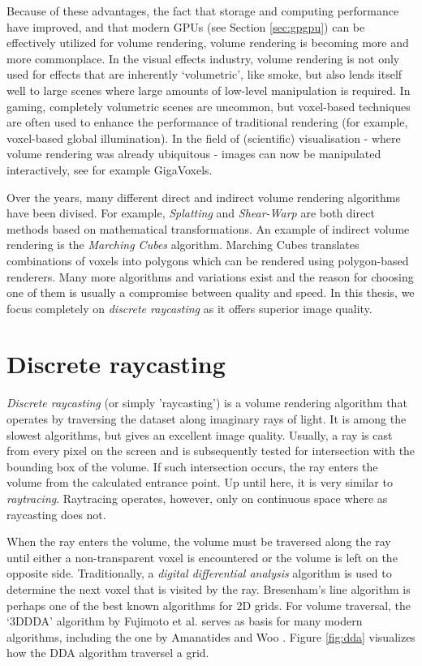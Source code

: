 Because of these advantages, the fact that storage and computing performance have improved, and that modern GPUs (see Section \ref{sec:gpgpu}) can be effectively utilized for volume rendering, volume rendering is becoming more and more commonplace. In the visual effects industry, volume rendering is not only used for effects that are inherently `volumetric', like smoke, but also lends itself well to large scenes where large amounts of low-level manipulation is required. In gaming, completely volumetric scenes are uncommon, but voxel-based techniques are often used to enhance the performance of traditional rendering (for example, voxel-based global illumination\cite{vbgi}). In the field of (scientific) visualisation - where volume rendering was already ubiquitous - images can now be manipulated interactively, see for example GigaVoxels\cite{crassin11}.

Over the years, many different direct and indirect volume rendering algorithms have been divised. For example, \emph{Splatting} \cite{qsplat} and \emph{Shear-Warp} \cite{shearwarp} are both direct methods based on mathematical transformations. An example of indirect volume rendering is the \emph{Marching Cubes} algorithm. Marching Cubes translates combinations of voxels into polygons which can be rendered using polygon-based renderers. Many more algorithms and variations exist and the reason for choosing one of them is usually a compromise between quality and speed. In this thesis, we focus completely on \emph{discrete raycasting} as it offers superior image quality.
%
\section{Discrete raycasting} \label{sec:raycasting}
%
\emph{Discrete raycasting} (or simply 'raycasting') is a volume rendering algorithm that operates by traversing the dataset along imaginary rays of light. It is among the slowest algorithms, but gives an excellent image quality. Usually, a ray is cast from every pixel on the screen and is subsequently tested for intersection with the bounding box of the volume. If such intersection occurs, the ray enters the volume from the calculated entrance point. Up until here, it is very similar to \emph{raytracing}. Raytracing operates, however, only on continuous space where as raycasting does not.

When the ray enters the volume, the volume must be traversed along the ray until either a non-transparent voxel is encountered or the volume is left on the opposite side. Traditionally, a \emph{digital differential analysis} algorithm is used to determine the next voxel that is visited by the ray. Bresenham's line algorithm \cite{bresenham65} is perhaps one of the best known algorithms for 2D grids. For volume traversal, the `3DDDA' algorithm by Fujimoto et al. \cite{fujimoto85} serves as basis for many modern algorithms, including the one by Amanatides and Woo \cite{amanatideswoo87}. Figure \ref{fig:dda} visualizes how the DDA algorithm traversel a grid.

